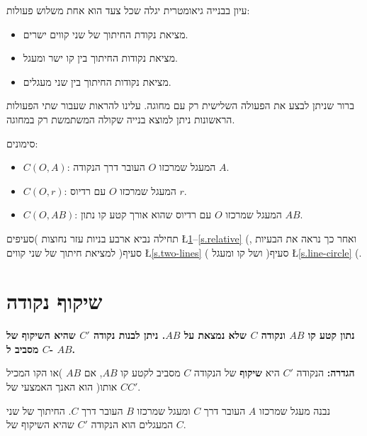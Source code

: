 \documentclass[12pt,a4paper]{article}
\begin{document}
עיון בבנייה גיאומטרית יגלה שכל צעד הוא אחת משלוש פעולות:
\begin{itemize}
\item
מציאת נקודת החיתוך של שני קווים ישרים.
\item
מציאת נקודות החיתוך בין קו ישר ומעגל.
\item
מציאת נקודות החיתוך בין שני מעגלים.
\end{itemize}
ברור שניתן לבצע את הפעולה השלישית רק עם מחוגה. עלינו להראות שעבור שתי הפעולות הראשונות ניתן למוצא בנייה שקולה המשתמשת רק במחוגה.

\newpage

סימונים:
\begin{itemize}
\item $C(O,A)$: 
המעגל שמרכזו
$O$
העובר דרך הנקודה
$A$.
\item $C(O,r)$:
המעגל שמרכזו
$O$
עם רדיוס
$r$.
\item $C(O,AB)$:
המעגל שמרכזו
$O$
עם רדיוס שהוא אורך קטע קו נתון
$AB$.
\end{itemize}

תחילה נביא ארבע בניות עזר נחוצות )סעיפים
\L{\ref{s.reflection}--\ref{s.relative}}%
(,
ואחר כך נראה את הבעיות למציאת חיתוך של שני קווים )סעיף
\L{\ref{s.two-lines}}%
( ושל קו ומעגל )סעיף
\L{\ref{s.line-circle}}%
(.



\section{%
שיקוף נקודה%
}\label{s.reflection}
\textbf{%
נתון קטע קו
$AB$
ונקודה 
$C$
שלא נמצאת על
$AB$.
ניתן לבנות נקודה 
$C'$
שהיא השיקוף של
$C$
מסביב ל-%
$AB$.
}

\textbf{%
הגדרה:%
}
הנקודה
$C'$
היא
\textbf{%
שיקוף%
}
של הנקודה
$C$
מסביב לקטע קו
$AB$,
אם 
$AB$
)או הקו המכיל אותו( הוא האנך האמצעי של
$CC'$.

נבנה מעגל שמרכזו
$A$
העובר דרך
$C$
ומעגל שמרכזו
$B$
העובר דרך
$C$.
החיתוך של שני המעגלים הוא הנקודה
$C'$
שהיא השיקוף של
$C$.
\end{document}
